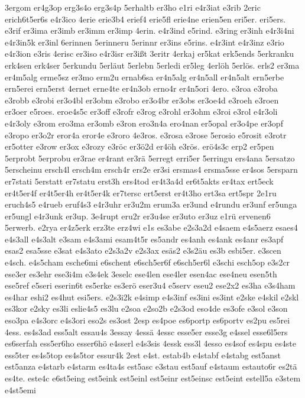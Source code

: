 {3ergom
er4g3op
erg3s4o
erg3s4p
5erhaltb
er3ho
e1ri
e4r3iat
e3rib
2eric
erich6t5er6s
e4r3ico
4erie
erie3b4
erief4
erie5fl
erie4ne
erien5en
eri5er.
eri5ers.
e3rif
er3ima
er3imb
er3imm
er3imp
4erin.
e4r3ind
e5rind.
e3ring
er3inh
e4r3i4ni
e4r3in5k
er3inl
6erinnen
5erinneru
5erinnr
er3ins
e5rins.
e4r3int
e4r3inz
e3rio
e4r3ion
e3ris
4erisc
er3iso
e4r3isr
er3ißt
3eritr
4erkaj
er5kat
erk5ends
5erkranku
erk4sen
erk4ser
5erkundu
5erläut
5erlebn
5erledi
er5leg
4erlöh
5erlös.
erls2
er3ma
er4m5alg
erme5sz
er3mo
erm2u
ernab6sa
er4n5alg
er4n5all
er4n5alt
ern5erbe
ern5erei
ern5erst
4ernet
erne4te
er4n3ob
erno4r
er4n5ori
4ero.
e3roa
e3roba
e3robb
e3robi
er3o4bl
er3obm
e3robo
er3o4br
er3obs
er3oe4d
e3roeh
e3roen
er3oer
e5roes.
eroe4s5c
er3off
e3rofr
e3rog
e3rohl
er3ohm
e3roi
e3rol
e4r3oli
e4r3oly
e3rom
ero3ma
er3omb
e3ron
ero3n4a
ero4nan
er5opal
er3o4pe
er3opf
e3ropo
er3o2r
eror4a
eror4e
e3roro
4e3ros.
e3rosa
e3rose
5erosio
e5rosit
e3rotr
er5otter
e3row
er3ox
e3rozy
e3röc
er3ö2d
er4öh
e3rös.
erö4s3c
erp2
er5pen
5erprobt
5erprobu
er3rae
er4rant
er3rä
5erregt
erri5er
5erringu
ers4ana
5ersatzo
5erscheinu
ersch4l
ersch4m
ersch4r
ers2e
er3si
ersmas4
ersma5sse
er4sos
5ersparn
er7stati
5erstatt
er7statu
erst3h
ers4tod
er4t3a4d
er6t5akts
er4tax
ert5eck
er4t5er4f
er4t5er4h
er4t5er4k
er7tersc
ert5erst
er4t3ho
ert3sa
ert5spr
2e1ru
eruch4s5
e4rueb
eruf4s3
e4r3uhr
er3u2m
erum3a
er3und
e4rundu
er3unf
er5unga
er5ungl
e4r3unk
er3up.
3e4rupt
eru2r
er3u4se
er3uto
er3uz
e1rü
ervenen6
5erwerb.
e2rya
er4z5erk
erz3te
erz4wi
e1s
es3abe
e2s3a2d
e4saem
e4s5aerz
esaes4
e4s3all
e4s3alt
e3sam
e4s3ami
esam4t5r
es5andr
es4anh
es4ank
es4anr
es3apf
esas2
esa5sse
e3sat
e4s3ato
e2s3a2v
e2s3ax
esäs2
e3s2äu
es3b
esbi5er.
e3scen
e4sch.
e4s5cham
esche6mi
e6schent
e6sch5er6f
e6sch5er6l
e3schi
esch5op
e3s2cr
ese3er
es3ehr
ese3i4m
e3s4ek
3eselc
ese4len
ese4ler
esen4ac
ese4neu
esen5th
ese5ref
e5seri
eserin6t
es5erke
es3erö
eser3u4
e5serv
eseu2
ese2x2
es3ha
e3s4ham
es4har
eshi2
es4hut
esi5ers.
e2s3i2k
e4simp
e4s3inf
es3ini
es3int
e2ske
e4skil
e2skl
es3kor
e2sky
es3li
eslie4s5
es3lu
e2soa
e2so2b
e2s3od
eso4de
es3ofe
e3sol
e3son
eso3pa
e4s3orc
e4s3ori
eso2s
es3ost
2esp
es4poe
es6portp
es6portv
es2pu
es5rei
4ess.
es4s3ad
ess5alt
essau4s
3essay
4essä
4essc
esse5er
esse3g
e4ssel
esse6l5ers
es6serfah
ess5er6ho
esser6hö
e4sserl
e4s3sis
4essk
ess3l
4esso
es4sof
es4spu
es4ste
ess5ter
es4s5top
es4s5tor
essur4k
2est
e4st.
estab4b
e4stabf
e4stabg
est5anst
est5anza
e4starb
e4starm
es4ta4s
est5asc
e3stau
est5auf
e4staum
estauto6r
es2tä
es4te.
este4c
e6st5eing
est5eink
est5einl
est5einr
est5einsc
est5eint
estell5a
e3stem
e4st5emi
}
